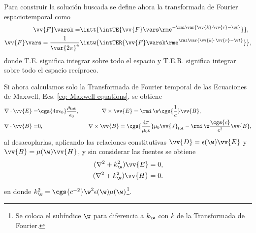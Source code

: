 \label{AppendixScalarPotentials}
Para construir la solución buscada se define ahora la transformada de Fourier espaciotemporal como
\begin{align}
\vv{F}\varsk = &\intt{\intTE{ \vv{F}\vars \rme^{-\rmi \var{\vv{k}\cdot\vv{r}-\w t}} }},\nonumber \\
\vv{F}\vars = \frac{1}{\var{2\pi}^4}&\intw{\intTER{ \vv{F}\varsk \rme^{\rmi\var{\vv{k}\cdot\vv{r}-\w t}} }},
\end{align}
donde T.E. significa integrar sobre todo el espacio y T.E.R. significa integrar sobre todo el espacio recíproco. 

Si ahora calculamos solo la Transformada de Fourier temporal de las Ecuaciones de Maxwell, Ecs. \eqref{eq: Maxwell equations}, se obtiene
\begin{align}
\nabla\cdot\vv{E} =& \cgs{4\pi\epsilon_0}\frac{\rho_{\text{tot}}}{\epsilon_0}, \qquad \qquad \nabla\times\vv{E}= \rmi \,\w\cgs{\frac{1}{c}}\vv{B}, \nonumber \\
\nabla\cdot\vv{B} =& 0, \qquad \qquad \qquad \qquad \nabla\times\vv{B}=\cgs{\frac{4\pi}{\mu_0 c}}\mu_0\vv{J}_{\text{tot}}- \rmi \, \w\frac{\cgs{c}}{c^2}\vv{E},
\label{eq: Maxwell equations freq}
\end{align}
al desacoplarlas, aplicando las relaciones constitutivas $\vv{D}=\epsilon(\w)\vv{E}$ y $\vv{B} = \mu(\w) \vv{H}$, y sin considerar las fuentes se obtiene
\begin{align*}
(\nabla^2 + k_{\w}^2)\vv{E} = 0, \\
(\nabla^2 + k_{\w}^2)\vv{H} = 0.
\end{align*}
en donde $k_{\w}^2= \cgs{c^{-2}} \w^2 \epsilon(\w) \mu(\w)$\footnote{Se coloca el subíndice $\w$ para diferencia a $k_\w$ con $k$ de la Transformada de Fourier.}.

